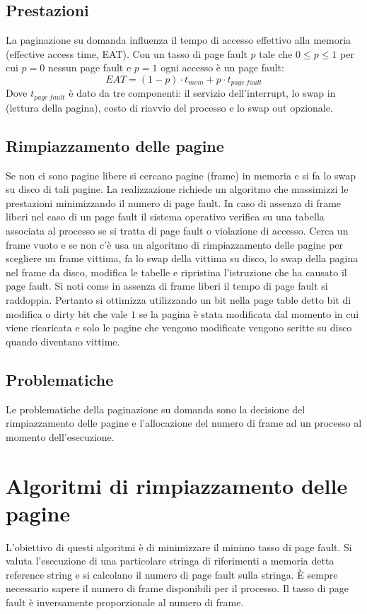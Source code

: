 \subsection{Prestazioni}
La paginazione su domanda influenza il tempo di accesso effettivo alla memoria (effective access time, EAT). Con un tasso di page fault $p$ tale che $0\le p\le 1$ per cui $p = 0$ nessun
page fault e $p = 1$ ogni accesso \`e un page fault:
$$EAT = (1 - p) \cdot t_{mem} + p\cdot t_{page\ fault}$$
Dove $t_{page\ fault}$ \`e dato da tre componenti: il servizio dell'interrupt, lo swap in (lettura della pagina), costo di riavvio del processo e lo swap out opzionale. 
\subsection{Rimpiazzamento delle pagine}
Se non ci sono pagine libere si cercano pagine (frame) in memoria e si fa lo swap su disco di tali pagine. La realizzazione richiede un algoritmo che massimizzi le prestazioni 
minimizzando il numero di page fault. In caso di assenza di frame liberi nel caso di un page fault il sistema operativo verifica su una tabella associata al processo se si tratta di
page fault o violazione di accesso. Cerca un frame vuoto e se non c'\`e usa un algoritmo di rimpiazzamento delle pagine per scegliere un frame vittima, fa lo swap della vittima su 
disco, lo swap della pagina nel frame da disco, modifica le tabelle e ripristina l'istruzione che ha causato il page fault. Si noti come in assenza di frame liberi il tempo di page
fault si raddoppia. Pertanto si ottimizza utilizzando un bit nella page table detto bit di modifica o dirty bit che vale $1$ se la pagina \`e stata modificata dal momento in cui viene
ricaricata e solo le pagine che vengono modificate vengono scritte su disco quando diventano vittime. 
\subsection{Problematiche}
Le problematiche della paginazione su domanda sono la decisione del rimpiazzamento delle pagine e l'allocazione del numero di frame ad un processo al momento dell'esecuzione. 
\section{Algoritmi di rimpiazzamento delle pagine}
L'obiettivo di questi algoritmi \`e di minimizzare il minimo tasso di page fault. Si valuta l'esecuzione di una particolare stringa di riferimenti a memoria detta reference string e
si calcolano il numero di page fault sulla stringa. \`E sempre necessario sapere il numero di frame disponibili per il processo. Il tasso di page fault \`e inversamente proporzionale
al numero di frame. 
